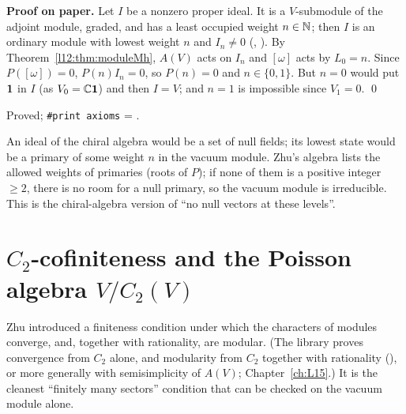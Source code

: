 \textbf{Proof on paper.} Let $I$ be a nonzero proper ideal. It is a $V$-submodule of the adjoint module, graded,
and has a least occupied weight $n\in{\mathbb{N}}$; then $I$ is an ordinary module with lowest weight $n$ and $I_n\neq0$
(, ). By Theorem~\ref{l12:thm:moduleMh}, $A(V)$ acts on $I_n$ and
$[\omega]$ acts by $L_0 = n$. Since $P([\omega]) = 0$, $P(n)I_n = 0$, so $P(n) = 0$ and $n\in\{0,1\}$. But $n=0$ would
put $\mathbf{1}$ in $I$ (as $V_0 = {\mathbb{C}}\mathbf{1}$) and then $I = V$; and $n = 1$ is impossible since $V_1=0$. \qed

\begin{status}
Proved; \texttt{\#print axioms} = .
\end{status}

\begin{physics}
An ideal of the chiral algebra would be a set of null fields; its lowest state would be a primary of some weight
$n$ in the vacuum module. Zhu's algebra lists the allowed weights of primaries (roots of $P$); if none of them is a
positive integer $\ge2$, there is no room for a null primary, so the vacuum module is irreducible. This is the
chiral-algebra version of ``no null vectors at these levels''.
\end{physics}

\section{\texorpdfstring{$C_2$}{C2}-cofiniteness and the Poisson algebra \texorpdfstring{$V/C_2(V)$}{V/C2(V)}}\label{l12:sec:c2}

Zhu introduced a finiteness condition under which the characters of modules converge, and, together with rationality,
are modular. (The library proves convergence from $C_2$ alone, and modularity from $C_2$ together with rationality
(), or more generally with semisimplicity of $A(V)$; Chapter~\ref{ch:L15}.) It is the cleanest ``finitely many sectors'' condition that can be checked on the vacuum
module alone.

